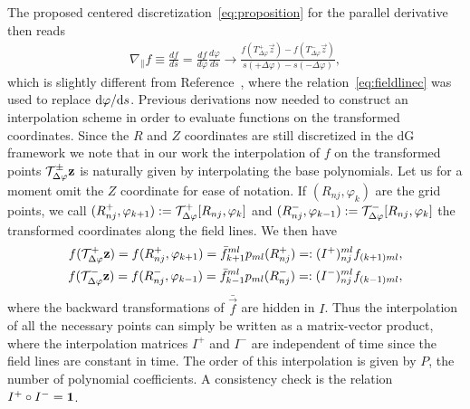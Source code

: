 The proposed centered discretization~\eqref{eq:proposition} for the parallel derivative then reads
\begin{align}
    \nabla_\parallel f \equiv \frac{df}{ds} = \frac{df}{d\varphi}\frac{d\varphi}{ds} 
    \rightarrow \frac{f\left(T_{\Delta\varphi}^+\vec z\right)-f\left(T_{\Delta\varphi}^-\vec z\right)}{s(+\Delta\varphi) - s(-\Delta\varphi)},
    \label{eq:paralleldis}
\end{align}
which is slightly different from Reference~\cite{Hariri2014}, where
the relation~\eqref{eq:fieldlinec} was used to replace $\mathrm{d} \varphi/\mathrm{d} s$. 
Previous derivations now needed to construct an interpolation scheme in order
to evaluate functions on the transformed coordinates. 
Since the $R$ and $Z$ coordinates are still discretized in the dG framework we note that in our work
the interpolation of $f$ on the transformed points $\mathcal T^\pm_{\Delta\varphi}{\mathbf{z}}$
is naturally given by interpolating the base polynomials. 
Let us for a moment omit the $Z$ coordinate for ease of notation. If $(R_{nj}, \varphi_k)$ are the grid points, 
we call $(R^+_{nj}, \varphi_{k+1}) := \mathcal T^+_{\Delta\varphi}[R_{nj}, \varphi_k]$ and $(R_{nj}^-, \varphi_{k-1}) := \mathcal T^-_{\Delta\varphi}[R_{nj}, \varphi_k]$ the transformed coordinates along
the field lines. We then have
\begin{subequations}
\begin{align}
    f(\mathcal T^+_{\Delta\varphi}{\mathbf{z}}) = f( R^+_{nj}, \varphi_{k+1}) = \bar f_{k+1}^{ml}p_{ml}(R^+_{nj}) =: (I^+)_{nj}^{ml}f_{(k+1)ml} , \\
    f(\mathcal T^-_{\Delta\varphi}{\mathbf{z}}) = f( R^-_{nj}, \varphi_{k-1}) = \bar f_{k-1}^{ml}p_{ml}(R^-_{nj}) =: (I^-)_{nj}^{ml}f_{(k-1)ml} , 
\end{align}
\label{eq:interpolation}
\end{subequations}
where the backward transformations of $\bar{ \vec f}$ are hidden in $I$.
Thus the interpolation of all the necessary points can simply be written as a matrix-vector product, where the interpolation matrices $I^+$  and $I^-$ are independent of time since
the field lines are constant in time. The order of this interpolation is given by $P$, the number of polynomial coefficients.
A consistency check is the relation $I^+\circ I^- = \mathbf{1}$. 

